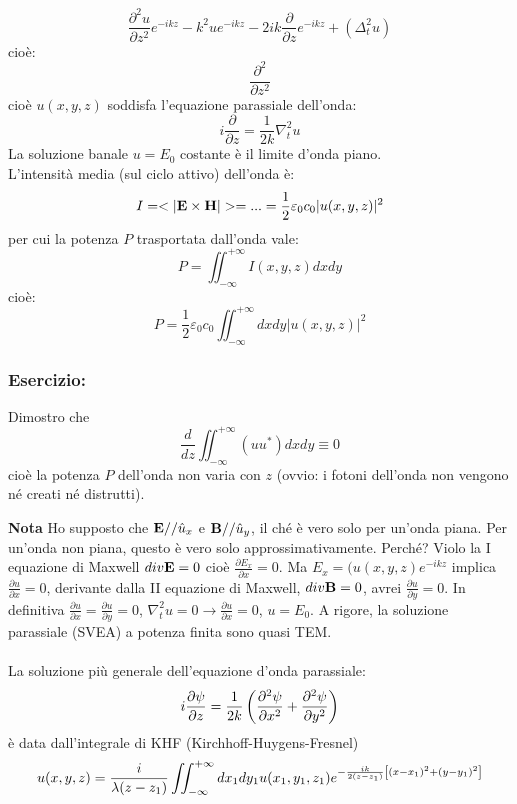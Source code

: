 \begin{equation*}
\frac{\partial^2 u}{\partial z^2} e^{-ikz} -k^2 u e^{-ikz} - 2ik \frac{\partial}{\partial z} e^{-ikz} + (\Delta_t^2 u) 
\end{equation*}
cioè:
\begin{equation*}
\frac{\partial^2}{\partial z^2}
\end{equation*}
cioè $u(x,y,z)$ soddisfa l'equazione parassiale dell'onda:
\begin{equation*}
i\frac{\partial}{\partial z} = \frac{1}{2k} \nabla_t^2 u
\end{equation*}
La soluzione banale $u = E_0$ costante è il limite d'onda piano.\\
L'intensità media (sul ciclo attivo) dell'onda è:
\begin{equation*}
I = <|\*E \times \*H|> = ... = \frac{1}{2} \varepsilon_0 c_0 |u(x,y,z)|^2
\end{equation*}
per cui la potenza $P$ trasportata dall'onda vale:
\begin{equation*}
P = \iint_{-\infty}^{+\infty} I(x,y,z) dxdy
\end{equation*}
cioè:
\begin{equation*}
P = \frac{1}{2} \varepsilon_0 c_0 \iint_{-\infty}^{+\infty} dxdy |u(x,y,z)|^2
\end{equation*}
\subsubsection{Esercizio:}
Dimostro che 
\begin{equation*}
\frac{d}{dz} \iint_{-\infty}^{+\infty} (uu^*) dxdy \equiv 0
\end{equation*}
cioè la potenza $P$ dell'onda non varia con $z$ (ovvio: i fotoni dell'onda non vengono né creati né distrutti).

\textbf{Nota} Ho supposto che $\mathbf{E} // \hat{u}_x$ e $\mathbf{B} // \hat{u}_y$, il ché è vero solo per un'onda piana. Per un'onda non piana, questo è vero solo approssimativamente. Perché? Violo la I equazione di Maxwell $div \mathbf{E} = 0$ cioè $\frac{\partial E_x}{\partial x} = 0$. Ma $E_x = (u(x,y,z) e^{-ikz}$  implica $\frac{\partial u}{\partial x} = 0$, derivante dalla II equazione di Maxwell, $div \mathbf{B} = 0$, avrei $\frac{\partial u}{\partial y} = 0$. In definitiva $\frac{\partial u}{\partial x} = \frac{\partial u}{\partial y} = 0$, $\nabla_t^2 u = 0 \rightarrow \frac{\partial u}{\partial x} = 0$, $u = E_0$. A rigore, la soluzione parassiale (SVEA) a potenza finita sono quasi TEM.\\
\\
La soluzione più generale dell'equazione d'onda parassiale:
\begin{equation*}
i \frac{\partial \psi}{\partial z} = \frac{1}{2k} \left(\frac{\partial^2 \psi}{\partial x^2} + \frac{\partial^2 \psi}{\partial y^2} \right)
\end{equation*}
è data dall'integrale di KHF (Kirchhoff-Huygens-Fresnel)
\begin{equation*}
u(x,y,z) = \frac{i}{\lambda (z - z_1)} \iint_{-\infty}^{+\infty} dx_1dy_1 u(x_1,y_1,z_1) e^{-\frac{ik}{2(z-z_1)} \left[ (x-x_1)^2 + (y-y_1)^2 \right]}
\end{equation*}

